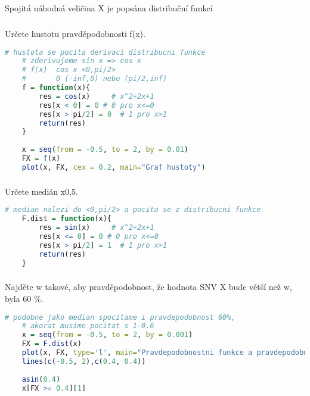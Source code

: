 \documentclass{article}%
\begin{document}
\newpage
\subsection{}
Spojitá náhodná veličina X je popsána distribuční funkcí 

\subsubsection{}
Určete hustotu pravděpodobnosti f(x). 
\begin{lstlisting}[language=R, showstringspaces=false, basicstyle=\small]
    # hustota se pocita derivaci distribucni funkce
    # zderivujeme sin x => cos x
    # f(x)  cos x <0,pi/2>
    #       0 (-inf,0) nebo (pi/2,inf)
    f = function(x){
        res = cos(x)     # x^2+2x+1
        res[x < 0] = 0 # 0 pro x<=0
        res[x > pi/2] = 0  # 1 pro x>1
        return(res)
    }
    
    x = seq(from = -0.5, to = 2, by = 0.01) 
    FX = f(x) 
    plot(x, FX, cex = 0.2, main="Graf hustoty")     
\end{lstlisting}

\subsubsection{}
Určete medián x0,5. 
\begin{lstlisting}[language=R, showstringspaces=false, basicstyle=\small]
    # median nalezi do <0,pi/2> a pocita se z distribucni funkce
    F.dist = function(x){
        res = sin(x)     # x^2+2x+1
        res[x <= 0] = 0 # 0 pro x<=0
        res[x > pi/2] = 1  # 1 pro x>1
        return(res)
    }
\end{lstlisting}

\subsubsection{}
Najděte w takové, aby pravděpodobnost, že hodnota SNV X bude větší než w, byla 60 \%. 
\begin{lstlisting}[language=R, showstringspaces=false, basicstyle=\small]
    # podobne jako median spocitame i pravdepodobnost 60%, 
    # akorat musime pocitat s 1-0.6
    x = seq(from = -0.5, to = 2, by = 0.001) 
    FX = F.dist(x) 
    plot(x, FX, type='l', main="Pravdepodobnostni funkce a pravdepodobnost 60%") 
    lines(c(-0.5, 2),c(0.4, 0.4))
    
    asin(0.4)
    x[FX >= 0.4][1]
\end{lstlisting}
\end{document}
